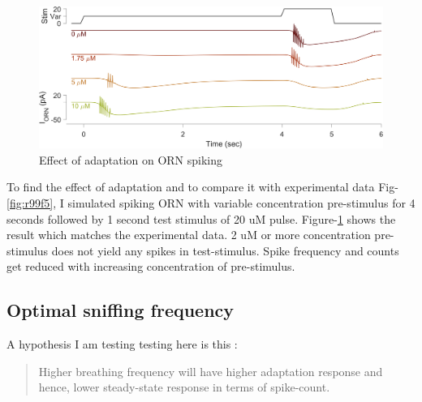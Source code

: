 \documentclass[
]{article}
\begin{document}
\begin{figure}

{\centering \includegraphics[width=0.9\linewidth]{figs/v1/fig_spk_compare_adaptation} 

}

\caption{Effect of adaptation on ORN spiking}\label{fig:rAdp}
\end{figure}

To find the effect of adaptation and to compare it with experimental data Fig-\ref{fig:r99f5}, I simulated spiking ORN with variable concentration pre-stimulus for 4 seconds followed by 1 second test stimulus of 20 uM pulse. Figure-\ref{fig:rAdp} shows the result which matches the experimental data. 2 uM or more concentration pre-stimulus does not yield any spikes in test-stimulus. Spike frequency and counts get reduced with increasing concentration of pre-stimulus.

\hypertarget{optimal-sniffing-frequency}{%
\subsection{Optimal sniffing frequency}\label{optimal-sniffing-frequency}}

A hypothesis I am testing testing here is this :

\begin{quote}
Higher breathing frequency will have higher adaptation response and hence, lower steady-state response in terms of spike-count.
\end{quote}
\end{document}
